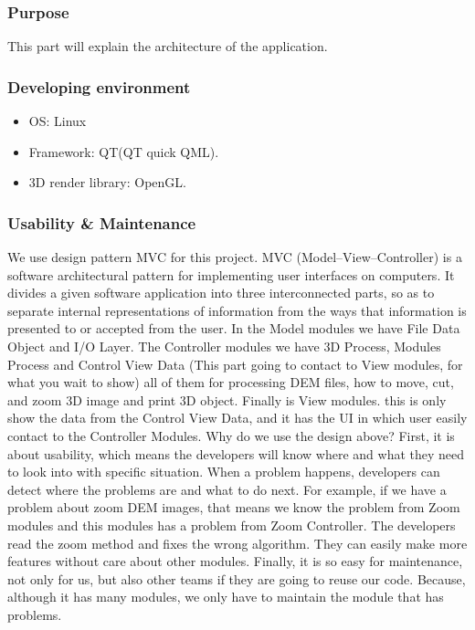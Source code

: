 \documentclass[11pt]{article}
\begin{document}
\subsubsection{Purpose}
This part will explain the architecture of the application.
\subsubsection{ Developing environment}
\begin{itemize}
\item OS: Linux
\item Framework: QT(QT quick QML).
\item 3D render library: OpenGL.
\end{itemize}

\subsubsection{Usability \& Maintenance}
\indent We use design pattern MVC for this project. MVC (Model–View–Controller) is a software architectural pattern for implementing user interfaces on computers. It divides a given software application into three interconnected parts, so as to separate internal representations of information from the ways that information is presented to or accepted from the user. In the Model modules we have File Data Object and I/O Layer. The Controller modules we have 3D Process, Modules Process and Control View Data (This part going to contact to View modules, for what you wait to show) all of them for processing DEM files, how to move, cut, and zoom 3D image and print 3D object. Finally is View modules. this is only show the data from the Control View Data, and it has the UI in which user easily contact to the Controller Modules.
\break
\indent Why do we use the design above? First, it is about usability, which means the developers will know where and what they need to look into with specific situation. When a problem happens, developers can detect where the problems are and what to do next. For example, if we have a problem about zoom DEM images, that means we know the problem from Zoom modules and this modules has a problem from Zoom Controller. The developers read the zoom method and fixes the wrong algorithm. They can easily make more features without care about other modules. Finally, it is so easy for maintenance, not only for us, but also other teams if they are going to reuse our code. Because, although it has many modules, we only have to maintain the module that has problems.
\break
\end{document}
